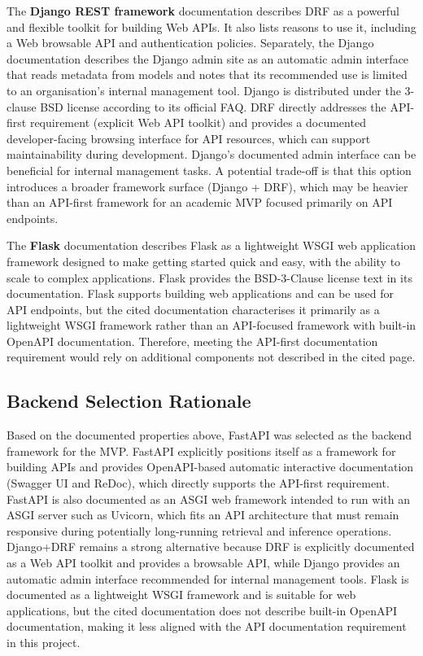 The \textbf{Django REST framework} documentation describes DRF as a powerful and flexible toolkit for building Web APIs. It also lists reasons to use it, including a Web browsable API and authentication policies. \parencite{DRFHome:online} Separately, the Django documentation describes the Django admin site as an automatic admin interface that reads metadata from models and notes that its recommended use is limited to an organisation’s internal management tool. \parencite{DjangoAdmin:online} Django is distributed under the 3-clause BSD license according to its official FAQ. \parencite{DjangoLicenseFAQ:online} DRF directly addresses the API-first requirement (explicit Web API toolkit) and provides a documented developer-facing browsing interface for API resources, which can support maintainability during development. Django’s documented admin interface can be beneficial for internal management tasks. A potential trade-off is that this option introduces a broader framework surface (Django + DRF), which may be heavier than an API-first framework for an academic MVP focused primarily on API endpoints.

The \textbf{Flask} documentation describes Flask as a lightweight WSGI web application framework designed to make getting started quick and easy, with the ability to scale to complex applications. \parencite{FlaskDocs:online} Flask provides the BSD-3-Clause license text in its documentation. \parencite{FlaskLicense:online} Flask supports building web applications and can be used for API endpoints, but the cited documentation characterises it primarily as a lightweight WSGI framework rather than an API-focused framework with built-in OpenAPI documentation. Therefore, meeting the API-first documentation requirement would rely on additional components not described in the cited page.

\subsection{Backend Selection Rationale}
Based on the documented properties above, FastAPI was selected as the backend framework for the MVP. FastAPI explicitly positions itself as a framework for building APIs and provides OpenAPI-based automatic interactive documentation (Swagger UI and ReDoc), which directly supports the API-first requirement. \parencite{FastAPIHome:online,FastAPIFeaturesDocs:online} FastAPI is also documented as an ASGI web framework intended to run with an ASGI server such as Uvicorn, which fits an API architecture that must remain responsive during potentially long-running retrieval and inference operations. \parencite{FastAPIDeployASGI:online} Django+DRF remains a strong alternative because DRF is explicitly documented as a Web API toolkit and provides a browsable API, while Django provides an automatic admin interface recommended for internal management tools. \parencite{DRFHome:online,DjangoAdmin:online} Flask is documented as a lightweight WSGI framework and is suitable for web applications, but the cited documentation does not describe built-in OpenAPI documentation, making it less aligned with the API documentation requirement in this project. \parencite{FlaskDocs:online}


